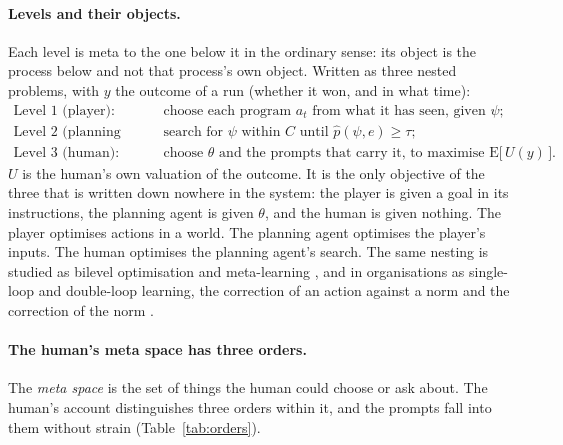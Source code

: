 \documentclass[11pt,a4paper]{article}
\begin{document}
\paragraph{Levels and their objects.} Each level is meta to the one below it in the ordinary sense: its object is the process below and not that process's own object. Written as three nested problems, with $y$ the outcome of a run (whether it won, and in what time):
\begin{align*}
\mbox{Level 1 (player):}\quad & \mbox{choose each program } a_t \mbox{ from what it has seen, given } \psi;\\
\mbox{Level 2 (planning agent):}\quad & \mbox{search for } \psi \mbox{ within } C \mbox{ until } \hat p(\psi, e) \ge \tau;\\
\mbox{Level 3 (human):}\quad & \mbox{choose } \theta \mbox{ and the prompts that carry it, to maximise } \mathrm{E}\big[\,U(y)\,\big].
\end{align*}
$U$ is the human's own valuation of the outcome. It is the only objective of the three that is written down nowhere in the system: the player is given a goal in its instructions, the planning agent is given $\theta$, and the human is given nothing. The player optimises actions in a world. The planning agent optimises the player's inputs. The human optimises the planning agent's search. The same nesting is studied as bilevel optimisation and meta-learning \citep{hospedales2022}, and in organisations as single-loop and double-loop learning, the correction of an action against a norm and the correction of the norm \citep{argyris1977}.

\paragraph{The human's meta space has three orders.} The \emph{meta space} is the set of things the human could choose or ask about. The human's account distinguishes three orders within it, and the prompts fall into them without strain (Table~\ref{tab:orders}).
\end{document}
